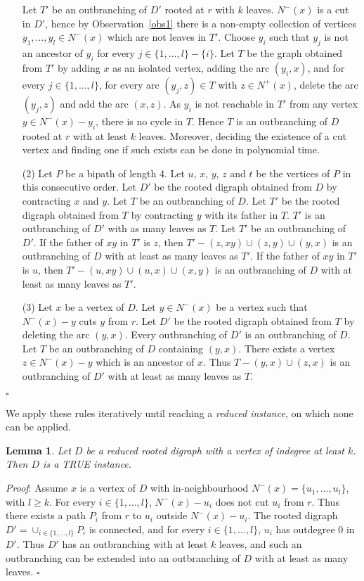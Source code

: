 \documentclass{article}
\newtheorem{lemma}{Lemma}
\begin{document}
\begin{itemize}
Let $T'$ be an outbranching of $D'$ rooted at $r$ with $k$ leaves. $N^-(x)$ is a cut in $D'$, hence by Observation~\ref{obs1} there is a non-empty collection of vertices $y_1,\dots,y_l\in N^-(x)$ which are not leaves in $T'$. Choose $y_i$ such that $y_j$ is not an ancestor of $y_i$ for every $j\in\{1,\dots,l\}-\{i\}$. Let $T$ be the graph obtained from $T'$ by adding $x$ as an isolated vertex, adding the arc $(y_i,x)$, and for every $j\in\{1,\dots,l\}$, for every arc $(y_j,z)\in T$ with $z\in N^+(x)$, delete the arc $(y_j,z)$ and add the arc $(x,z)$. As $y_i$ is not reachable in $T'$ from any vertex $y\in N^-(x)-y_i$, there is no cycle in $T$. Hence $T$ is an outbranching of $D$ rooted at $r$ with at least $k$ leaves. Moreover, deciding the existence of a cut vertex and finding one if such exists can be done in polynomial time.
\item[(2)] Let $P$ be a bipath of length 4. Let $u$, $x$, $y$, $z$ and $t$ be the vertices of $P$ in this consecutive order. Let $D'$ be the rooted digraph obtained from $D$ by contracting $x$ and $y$. Let $T$ be an outbranching of $D$. Let $T'$ be the rooted digraph obtained from $T$ by contracting $y$ with its father in $T$. $T'$ is an outbranching of $D'$ with as many leaves as $T$. Let $T'$ be an outbranching of $D'$. If the father of $xy$ in $T'$ is $z$, then $T'-(z,xy)\cup (z,y) \cup (y,x)$ is an outbranching of $D$ with at least as many leaves as $T'$. If the father of $xy$ in $T'$ is $u$, then $T'-(u,xy)\cup (u,x) \cup (x,y)$ is an outbranching of $D$ with at least as many leaves as $T'$.
\item[(3)] Let $x$ be a vertex of $D$. Let $y\in N^-(x)$ be a vertex such that $N^-(x)-y$ cuts $y$ from $r$. Let $D'$ be the rooted digraph obtained from $T$ by deleting the arc $(y,x)$. Every outbranching of $D'$ is an outbranching of $D$. Let $T$ be an outbranching of $D$ containing $(y,x)$. There exists a vertex $z\in N^-(x)-y$ which is an ancestor of $x$. Thus $T-(y,x)\cup (z,x)$ is an outbranching of $D'$ with at least as many leaves as $T$.
\end{itemize}
$\square$




We apply these rules iteratively until reaching a \emph{reduced instance}, on which none can be applied.
\begin{lemma}\label{largedegree}
Let $D$ be a reduced rooted digraph with a vertex of indegree at least $k$. Then $D$ is a TRUE instance. 
\end{lemma}
\emph{Proof}: Assume $x$ is a vertex of $D$ with in-neighbourhood $N^-(x)=\{u_1,\dots,u_l\}$, with $l\ge k$. For every $i\in\{1,\dots,l\}$, $N^-(x)-u_i$ does not cut $u_i$ from $r$. Thus there exists a path $P_i$ from $r$ to $u_i$ outside $N^-(x)-u_i$. The rooted digraph $D'=\cup_{i\in\{1,\dots,l\}} P_i$ is connected, and for every $i\in\{1,\dots,l\}$, $u_i$ has outdegree 0 in $D'$. Thus $D'$ has an outbranching with at least $k$ leaves, and such an outbranching can be extended into an outbranching of $D$ with at least as many leaves. $\square$
\end{document}
